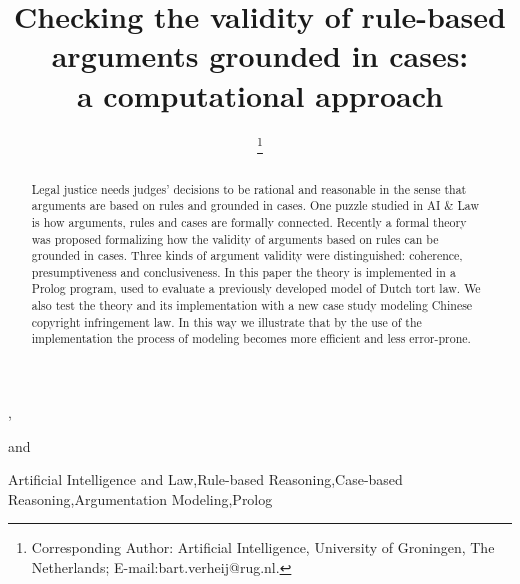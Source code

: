 \documentclass{IOS-Book-Article}
\begin{document}
\pagestyle{headings}
\def\thepage{}

\begin{frontmatter} 

\title{Checking the validity of rule-based arguments grounded in cases: \\a computational approach}


\author[A]{ }, \author[B]{ } and \author[A]{ \thanks{Corresponding Author: Artificial Intelligence, University of Groningen, The Netherlands; E-mail:bart.verheij@rug.nl.}}

\address[A]{Artificial Intelligence, University of Groningen, The Netherlands}
\address[B]{Institute of Logic and Cognition, Sun Yat-sen University, Guangzhou, China}

\begin{abstract}
Legal justice needs judges' decisions to be rational and reasonable in the sense that arguments are based on rules and grounded in cases.  One puzzle studied in AI \& Law is how arguments, rules and cases are formally connected. Recently a formal theory was proposed formalizing how the validity of arguments based on rules can be grounded in cases. Three kinds of argument validity were distinguished: coherence, presumptiveness and conclusiveness. In this paper the theory is implemented in a Prolog program, used to evaluate a previously developed model of Dutch tort law. We also test the theory and its implementation with a new case study modeling Chinese copyright infringement law. In this way we illustrate that by the use of the implementation the process of modeling becomes more efficient and less error-prone.
\end{abstract}

\begin{keyword}
Artificial Intelligence and Law\sep Rule-based Reasoning\sep Case-based Reasoning\sep Argumentation Modeling\sep Prolog
\end{keyword}
\end{frontmatter}
\end{document}
